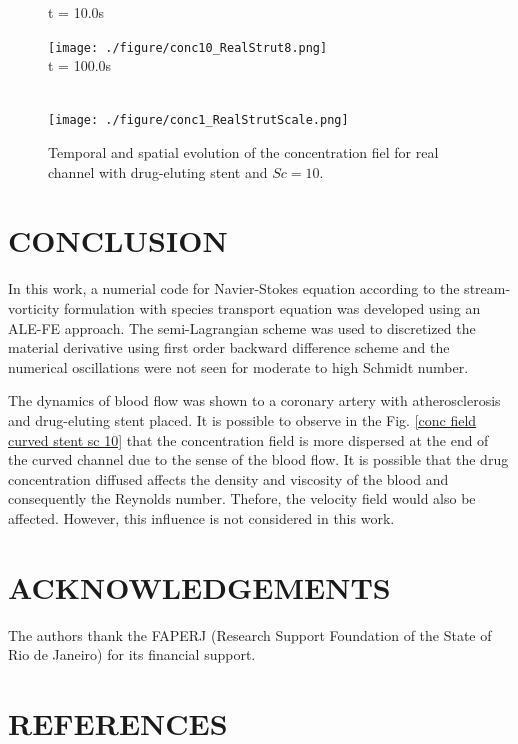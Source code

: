 \documentclass[10pt,fleqn,a4paper,twoside]{article}
\begin{document}
\begin{figure}[H]
\begin{minipage}{.50\linewidth}
      t = 10.0s
     \end{minipage}%
     \begin{minipage}{.50\linewidth}
     \medskip
      \centering
      \texttt{[image: ./figure/conc10\_RealStrut8.png]}\\
      t = 100.0s
     \end{minipage}\\[10pt]
      \centering
      \texttt{[image: ./figure/conc1\_RealStrutScale.png]}\\
     \medskip
     \label{conc field real stent sc 10}
    \caption{
Temporal and spatial evolution of the concentration fiel for real channel with drug-eluting stent and $Sc=10$.}
\end{figure}




\section{CONCLUSION}
In this work, a numerial code for Navier-Stokes equation according to 
the stream-vorticity formulation with species
transport equation was developed using an ALE-FE approach.
The semi-Lagrangian scheme was used to discretized the material derivative
using first order backward difference scheme and the numerical oscillations
were not seen for moderate to high Schmidt number.

\smallskip
The dynamics of blood flow was shown to a coronary artery with atherosclerosis and
drug-eluting stent placed.
It is possible to observe in the Fig. \ref{conc field curved stent sc 10}  that
the concentration field
is more dispersed at the end of the curved channel due to
the sense of the blood flow. It is possible that the
drug concentration diffused affects the density and viscosity of the blood
and consequently the Reynolds number. Thefore, the velocity field would
also be affected. However, this influence is not considered in this work.




\section{ACKNOWLEDGEMENTS}
The authors thank the 
FAPERJ (Research Support Foundation of the State of Rio de Janeiro)
for its financial support.


\section{REFERENCES} 

\renewcommand{\refname}{}

\end{document}
